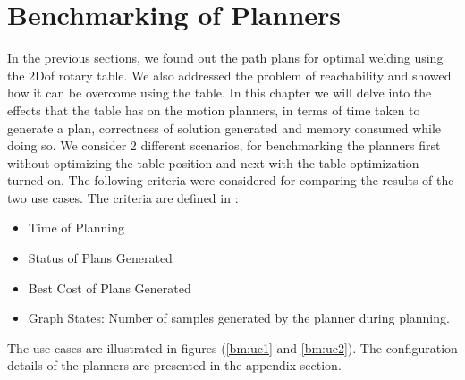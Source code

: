 \section{Benchmarking of Planners}
In the previous sections, we found out the path plans for optimal welding using the 2Dof rotary table. We also addressed the problem of reachability and showed how it can be overcome using the table. In this chapter we will delve into the effects that the table has on the motion planners, in terms of time taken to generate a plan, correctness of solution generated and memory consumed while doing so. We consider 2 different scenarios, for benchmarking the planners first without optimizing the table position and next with the table optimization turned on. The following criteria were considered for comparing the results of the two use cases. The criteria are defined in \citet{moll2015benchmarking-motion-planning-algorithms}:
\begin{itemize}
	\item Time of Planning
	\item Status of Plans Generated
	\item Best Cost of Plans Generated
	\item Graph States: Number of samples generated by the planner during planning.
\end{itemize}
The use cases are illustrated in figures (\ref{bm:uc1} and \ref{bm:uc2}).
The configuration details of the planners are presented in the appendix section.
